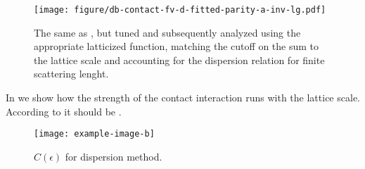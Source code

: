 \begin{figure}[th]
    \texttt{[image: figure/db-contact-fv-d-fitted-parity-a-inv-lg.pdf]}
    \caption{The same as , but tuned and subsequently analyzed using the appropriate latticized \Luscher function, matching the cutoff on the sum to the lattice scale and accounting for the dispersion relation for finite scattering lenght.}
    \label{fig:unimproved dispersion finite a}
\end{figure}

In  we show how the strength of the contact interaction runs with the lattice scale.  According to  it should be .

\begin{figure}
    \texttt{[image: example-image-b]}
    \caption{$C(\epsilon)$ for dispersion method.  }
    \label{fig:running of strength}
\end{figure}
